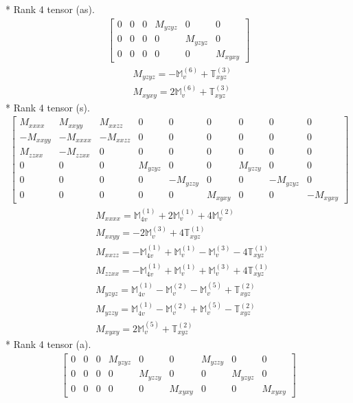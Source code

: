 \documentclass[fleqn,8pt,landscape]{jsarticle}
\begin{document}
* Rank 4 tensor (as).
\begin{align*}
\begin{bmatrix} 0 & 0 & 0 & M_{yzyz} & 0 & 0 \\ 0 & 0 & 0 & 0 & M_{yzyz} & 0 \\ 0 & 0 & 0 & 0 & 0 & M_{xyxy} \end{bmatrix}
\end{align*}
\begin{align*}
& M_{yzyz} = - \mathbb{M}_{v}^{(6)} + \mathbb{T}_{xyz}^{(3)} \\
& M_{xyxy} = 2 \mathbb{M}_{v}^{(6)} + \mathbb{T}_{xyz}^{(3)}
\end{align*}
* Rank 4 tensor (s).
\begin{align*}
\begin{bmatrix} M_{xxxx} & M_{xxyy} & M_{xxzz} & 0 & 0 & 0 & 0 & 0 & 0 \\ - M_{xxyy} & - M_{xxxx} & - M_{xxzz} & 0 & 0 & 0 & 0 & 0 & 0 \\ M_{zzxx} & - M_{zzxx} & 0 & 0 & 0 & 0 & 0 & 0 & 0 \\ 0 & 0 & 0 & M_{yzyz} & 0 & 0 & M_{yzzy} & 0 & 0 \\ 0 & 0 & 0 & 0 & - M_{yzzy} & 0 & 0 & - M_{yzyz} & 0 \\ 0 & 0 & 0 & 0 & 0 & M_{xyxy} & 0 & 0 & - M_{xyxy} \end{bmatrix}
\end{align*}
\begin{align*}
& M_{xxxx} = \mathbb{M}_{4v}^{(1)} + 2 \mathbb{M}_{v}^{(1)} + 4 \mathbb{M}_{v}^{(2)} \\
& M_{xxyy} = - 2 \mathbb{M}_{v}^{(3)} + 4 \mathbb{T}_{xyz}^{(1)} \\
& M_{xxzz} = - \mathbb{M}_{4v}^{(1)} + \mathbb{M}_{v}^{(1)} - \mathbb{M}_{v}^{(3)} - 4 \mathbb{T}_{xyz}^{(1)} \\
& M_{zzxx} = - \mathbb{M}_{4v}^{(1)} + \mathbb{M}_{v}^{(1)} + \mathbb{M}_{v}^{(3)} + 4 \mathbb{T}_{xyz}^{(1)} \\
& M_{yzyz} = \mathbb{M}_{4v}^{(1)} - \mathbb{M}_{v}^{(2)} - \mathbb{M}_{v}^{(5)} + \mathbb{T}_{xyz}^{(2)} \\
& M_{yzzy} = \mathbb{M}_{4v}^{(1)} - \mathbb{M}_{v}^{(2)} + \mathbb{M}_{v}^{(5)} - \mathbb{T}_{xyz}^{(2)} \\
& M_{xyxy} = 2 \mathbb{M}_{v}^{(5)} + \mathbb{T}_{xyz}^{(2)}
\end{align*}
* Rank 4 tensor (a).
\begin{align*}
\begin{bmatrix} 0 & 0 & 0 & M_{yzyz} & 0 & 0 & M_{yzzy} & 0 & 0 \\ 0 & 0 & 0 & 0 & M_{yzzy} & 0 & 0 & M_{yzyz} & 0 \\ 0 & 0 & 0 & 0 & 0 & M_{xyxy} & 0 & 0 & M_{xyxy} \end{bmatrix}
\end{align*}
\end{document}

